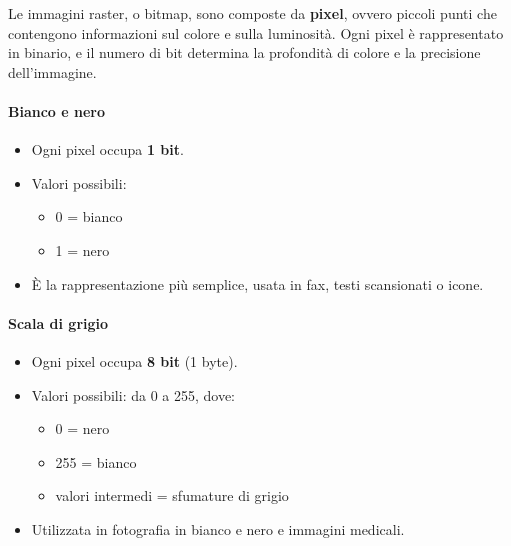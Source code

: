 \documentclass[12pt]{article}
\begin{document}
Le immagini raster, o bitmap, sono composte da \textbf{pixel}, ovvero piccoli punti che contengono informazioni sul colore e sulla luminosità.  
Ogni pixel è rappresentato in binario, e il numero di bit determina la profondità di colore e la precisione dell'immagine.

\paragraph{Bianco e nero}  
\begin{itemize}
  \item Ogni pixel occupa \textbf{1 bit}.  
  \item Valori possibili:  
  \begin{itemize}
    \item 0 = bianco
    \item 1 = nero
  \end{itemize}  
  \item È la rappresentazione più semplice, usata in fax, testi scansionati o icone.
\end{itemize}


\paragraph{Scala di grigio}  
\begin{itemize}
  \item Ogni pixel occupa \textbf{8 bit} (1 byte).  
  \item Valori possibili: da 0 a 255, dove:  
  \begin{itemize}
    \item 0 = nero
    \item 255 = bianco
    \item valori intermedi = sfumature di grigio
  \end{itemize}  
  \item Utilizzata in fotografia in bianco e nero e immagini medicali.
\end{itemize}
\end{document}
